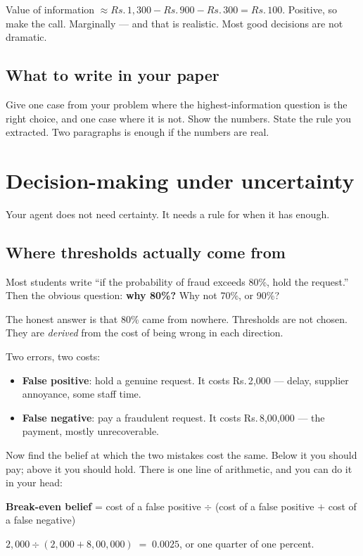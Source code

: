 \documentclass[11pt,a4paper]{article}
\newcommand{\rs}{Rs.\,}
\begin{document}
Value of information $\approx \rs 1{,}300 - \rs 900 - \rs 300 = \rs 100$. Positive, so make the
call. Marginally --- and that is realistic. Most good decisions are not dramatic.

\subsection{What to write in your paper}

Give one case from your problem where the highest-information question is the right choice, and
one case where it is not. Show the numbers. State the rule you extracted. Two paragraphs is
enough if the numbers are real.

\section{Decision-making under uncertainty}
\label{sec:decision}

Your agent does not need certainty. It needs a rule for when it has enough.

\subsection{Where thresholds actually come from}

Most students write ``if the probability of fraud exceeds 80\%, hold the request.'' Then the
obvious question: \textbf{why 80\%?} Why not 70\%, or 90\%?

The honest answer is that 80\% came from nowhere. Thresholds are not chosen. They are
\emph{derived} from the cost of being wrong in each direction.

Two errors, two costs:

\begin{itemize}
  \item \textbf{False positive}: hold a genuine request. It costs \rs 2{,}000 --- delay, supplier
        annoyance, some staff time.
  \item \textbf{False negative}: pay a fraudulent request. It costs \rs 8{,}00{,}000 --- the
        payment, mostly unrecoverable.
\end{itemize}

Now find the belief at which the two mistakes cost the same. Below it you should pay; above it
you should hold. There is one line of arithmetic, and you can do it in your head:

\begin{sbrule}
\textbf{Break-even belief} \;=\; cost of a false positive \;$\div$\; (cost of a false positive
$+$ cost of a false negative)

\vspace{3pt}
$2{,}000 \div (2{,}000 + 8{,}00{,}000) \;=\; \mathbf{0.0025}$, or one quarter of one percent.
\end{sbrule}
\end{document}
